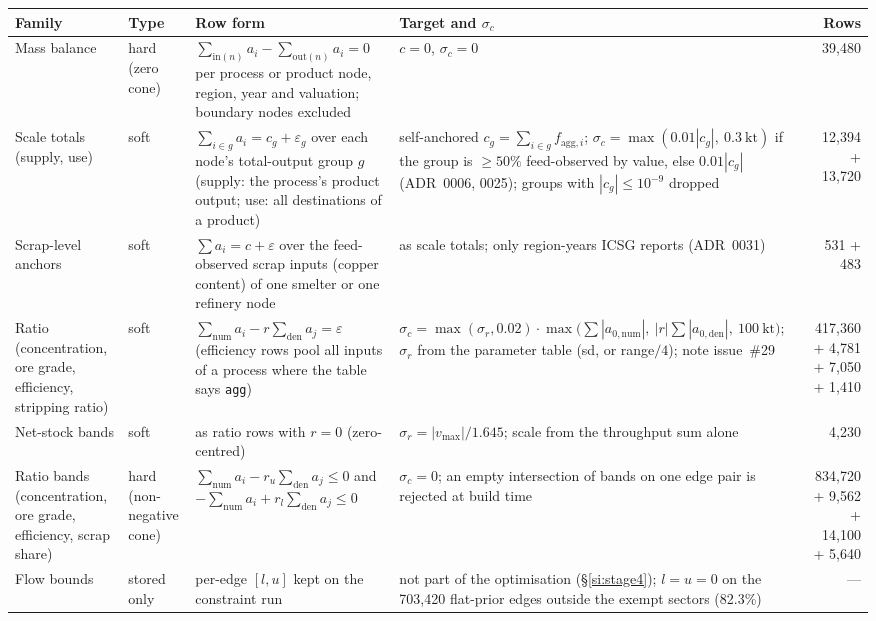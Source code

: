 \documentclass[11pt]{article}
\begin{document}
\begin{table}[h]
\centering\footnotesize
\begin{tabular}{@{}p{3.1cm}p{1.5cm}p{4.3cm}p{4.2cm}r@{}}
\toprule
Family & Type & Row form & Target and $\sigma_c$ & Rows \\
\midrule
Mass balance & hard (zero cone) & $\sum_{\mathrm{in}(n)} a_i -
\sum_{\mathrm{out}(n)} a_i = 0$ per process or product node, region, year and
valuation; boundary nodes excluded & $c=0$, $\sigma_c = 0$ & 39{,}480 \\[3pt]
Scale totals (supply, use) & soft & $\sum_{i\in g} a_i = c_g +
\varepsilon_g$ over each node's total-output group $g$ (supply: the
process's product output; use: all destinations of a product) & self-anchored
$c_g = \sum_{i\in g} f_{\mathrm{agg},i}$; $\sigma_c = \max(0.01|c_g|,\
0.3\ \mathrm{kt})$ if the group is $\ge 50\%$ feed-observed by value, else
$0.01|c_g|$ (ADR~0006, 0025); groups with $|c_g|\le 10^{-9}$ dropped & 12{,}394
+ 13{,}720 \\[3pt]
Scrap-level anchors & soft & $\sum a_i = c + \varepsilon$ over the
feed-observed scrap inputs (copper content) of one smelter or one refinery
node & as scale totals; only region-years ICSG reports (ADR~0031) & 531 +
483 \\[3pt]
Ratio (concentration, ore grade, efficiency, stripping ratio) & soft &
$\sum_{\mathrm{num}} a_i - r \sum_{\mathrm{den}} a_j = \varepsilon$
(efficiency rows pool all inputs of a process where the table says
\texttt{agg}) & $\sigma_c = \max(\sigma_r, 0.02) \cdot
\max\bigl(\sum|a_{0,\mathrm{num}}|,\ |r|\sum|a_{0,\mathrm{den}}|,\
100\ \mathrm{kt}\bigr)$; $\sigma_r$ from the parameter table (sd, or
range$/4$); note issue~\#29 & 417{,}360 + 4{,}781 + 7{,}050 + 1{,}410 \\[3pt]
Net-stock bands & soft & as ratio rows with $r=0$ (zero-centred) &
$\sigma_r = |v_{\max}|/1.645$; scale from the throughput sum alone & 4{,}230 \\[3pt]
Ratio bands (concentration, ore grade, efficiency, scrap share) & hard
(non-negative cone) & $\sum_{\mathrm{num}} a_i - r_u \sum_{\mathrm{den}} a_j
\le 0$ and $-\sum_{\mathrm{num}} a_i + r_l \sum_{\mathrm{den}} a_j \le 0$ &
$\sigma_c = 0$; an empty intersection of bands on one edge pair is rejected at
build time & 834{,}720 + 9{,}562 + 14{,}100 + 5{,}640 \\[3pt]
Flow bounds & stored only & per-edge $[l, u]$ kept on the constraint run &
not part of the optimisation (\S\ref{si:stage4}); $l = u = 0$ on the
703{,}420 flat-prior edges outside the exempt sectors (82.3\%) & --- \\

\end{tabular}
\end{table}
\end{document}
